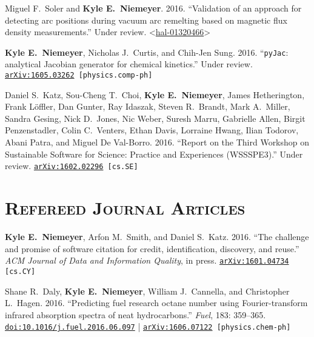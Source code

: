 \documentclass[margin,line,11pt]{res}
\makeatletter
\newlength{\bibhang}
\newlength{\bibsep}
 {\@listi \global\bibsep\itemsep \global\advance\bibsep by\parsep}
\newenvironment{bibenum*}
  {\renewcommand\labelenumi{\theenumi.}%
   \etaremune[
     topsep=0pt,
     itemsep=\bibsep,
     parsep=0pt,partopsep=0pt,
     itemindent=-\bibhang,
     leftmargin={\bibhang+\widthof{[999]}}]}
  {\endetaremune}
\newcommand*{\doi}[1]{\href{http://dx.doi.org/#1}{\nolinkurl{doi:#1}}}
\makeatother
\begin{document}
\begin{resume}
\begin{bibenum*}
\item Miguel F.~Soler and \textbf{Kyle E.~Niemeyer}.
2016.
``Validation of an approach for detecting arc positions during vacuum arc remelting based on magnetic flux density measurements.''
Under review. <\href{https://hal.archives-ouvertes.fr/hal-01320466}{hal-01320466}>

\item \textbf{Kyle E.~Niemeyer}, Nicholas J.~Curtis, and Chih-Jen Sung.
2016.
``\texttt{pyJac}: analytical Jacobian generator for chemical kinetics.''
Under review. {\tt \href{http://arxiv.org/abs/1605.03262}{arXiv:1605.03262} [physics.comp-ph]}

\item Daniel S.~Katz, Sou-Cheng T.\ Choi, \textbf{Kyle E.\ Niemeyer}, James Hetherington, Frank L\"{o}ffler, Dan Gunter, Ray Idaszak, Steven R.\ Brandt, Mark A.\ Miller, Sandra Gesing, Nick D.\ Jones, Nic Weber, Suresh Marru, Gabrielle Allen, Birgit Penzenstadler, Colin C.\ Venters, Ethan Davis, Lorraine Hwang, Ilian Todorov, Abani Patra, and Miguel De Val-Borro.
2016.
``Report on the Third Workshop on Sustainable Software for Science: Practice and Experiences (WSSSPE3).''
Under review. {\tt \href{http://arxiv.org/abs/1602.02296}{arXiv:1602.02296} [cs.SE]}

\end{bibenum*}

\section{\textsc{Refereed Journal Articles}}

\begin{bibenum*}

\item \textbf{Kyle E.\ Niemeyer}, Arfon M.\ Smith, and Daniel S.\ Katz.
2016.
``The challenge and promise of software citation for credit, identification, discovery, and reuse.''
\emph{ACM Journal of Data and Information Quality}, in press. {\tt \href{http://arxiv.org/abs/1601.04734}{arXiv:1601.04734} [cs.CY]}

\item Shane R.~Daly, \textbf{Kyle E.~Niemeyer}, William J.~Cannella, and Christopher L.~Hagen.
2016.
``Predicting fuel research octane number using Fourier-transform infrared absorption spectra of neat hydrocarbons.''
\emph{Fuel}, 183: 359--365.
\doi{10.1016/j.fuel.2016.06.097} |
{\tt \href{http://arxiv.org/abs/1606.07122}{arXiv:1606.07122} [physics.chem-ph]}


\end{bibenum*}
\end{resume}
\end{document}

